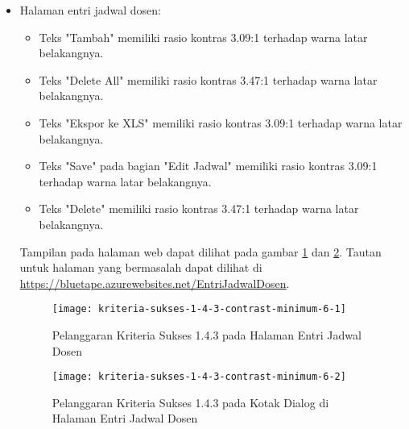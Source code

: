 \begin{itemize}
    \item Halaman entri jadwal dosen: 
    \begin{itemize}
        \item Teks "Tambah" memiliki rasio kontras 3.09:1 terhadap warna latar belakangnya.
        \item Teks "Delete All" memiliki rasio kontras 3.47:1 terhadap warna latar belakangnya.
        \item Teks "Ekspor ke XLS" memiliki rasio kontras 3.09:1 terhadap warna latar belakangnya.
        \item Teks "Save" pada bagian "Edit Jadwal" memiliki rasio kontras 3.09:1 terhadap warna latar belakangnya.
        \item Teks "Delete" memiliki rasio kontras 3.47:1 terhadap warna latar belakangnya.
    \end{itemize}
    Tampilan pada halaman web dapat dilihat pada gambar \ref{fig:1.4.3_contrast_minimum_6_1} dan \ref{fig:1.4.3_contrast_minimum_6_2}. Tautan untuk halaman yang bermasalah dapat dilihat di \url{https://bluetape.azurewebsites.net/EntriJadwalDosen}.	
    \begin{figure}[H]
        \centering  
        \texttt{[image: kriteria-sukses-1-4-3-contrast-minimum-6-1]}  
        \caption[Pelanggaran Kriteria Sukses 1.4.3 pada Halaman Entri Jadwal Dosen]{Pelanggaran Kriteria Sukses 1.4.3 pada Halaman Entri Jadwal Dosen}
        \label{fig:1.4.3_contrast_minimum_6_1}  
    \end{figure} 
    
    \begin{figure}[H]
        \centering  
        \texttt{[image: kriteria-sukses-1-4-3-contrast-minimum-6-2]}  
        \caption[Pelanggaran Kriteria Sukses 1.4.3 pada Kotak Dialog di Halaman Entri Jadwal Dosen]{Pelanggaran Kriteria Sukses 1.4.3 pada Kotak Dialog di Halaman Entri Jadwal Dosen}
        \label{fig:1.4.3_contrast_minimum_6_2}  
    \end{figure} 


\end{itemize}
